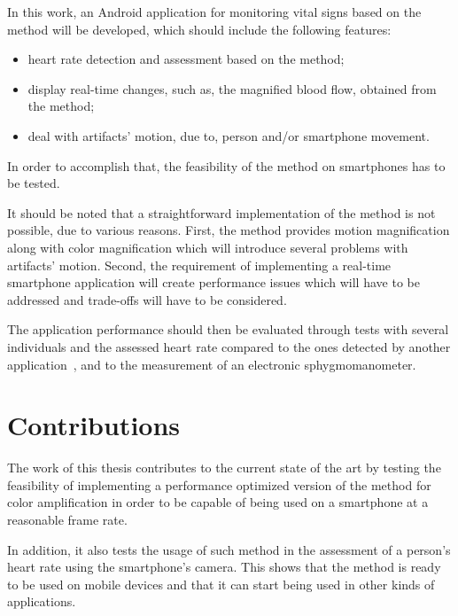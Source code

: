 
In this work, an Android application for monitoring vital signs based on
the \evm{} method will be developed, which should include the following
features:

\begin{itemize}
  \item heart rate detection and assessment based on the \evm{}
        method;
  \item display real-time changes, such as, the magnified blood
        flow, obtained from the \evm{} method;
  \item deal with artifacts' motion, due to, person and/or
        smartphone movement.
\end{itemize}

In order to accomplish that, the feasibility of the \evm{} method on
smartphones has to be tested.

It should be noted that a straightforward implementation of the \evm{}
method is not possible, due to various reasons. First, the \evm{} method
provides motion magnification along with color magnification which will
introduce several problems with artifacts' motion. Second, the requirement
of implementing a real-time smartphone application will create performance
issues which will have to be addressed and trade-offs will have to be
considered.

The application performance should then be evaluated through tests
with several individuals and the assessed heart rate compared to
the ones detected by another application~\cite{Vitrox2013, Philips2013},
and to the measurement of an electronic sphygmomanometer.

\pagebreak

\section{Contributions} \label{sec:intro:contributions}

The work of this thesis contributes to the current state of the art by
testing the feasibility of implementing a performance optimized version of
the \evm{} method for color amplification in order to be capable of being used
on a smartphone at a reasonable frame rate.

In addition, it also tests the usage of such method in the assessment of
a person's heart rate using the smartphone's camera. This shows that the method
is ready to be used on mobile devices and that it can start being used in
other kinds of applications.

